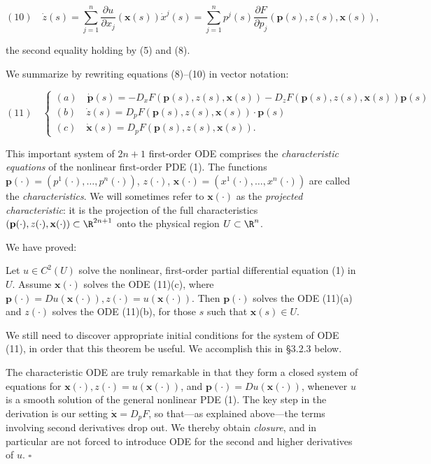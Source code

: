 $$(10) \quad \dot{z}(s) = \sum_{j=1}^{n} \frac{\partial u}{\partial x_j}(\mathbf{x}(s))\dot{x}^j(s) = \sum_{j=1}^{n} p^j(s) \frac{\partial F}{\partial p_j}(\mathbf{p}(s), z(s), \mathbf{x}(s)),$$

the second equality holding by (5) and (8).

We summarize by rewriting equations (8)--(10) in vector notation:

$$(11) \quad \begin{cases} (a) \quad \dot{\mathbf{p}}(s) = -D_x F(\mathbf{p}(s), z(s), \mathbf{x}(s)) - D_z F(\mathbf{p}(s), z(s), \mathbf{x}(s))\mathbf{p}(s) \\ (b) \quad \dot{z}(s) = D_p F(\mathbf{p}(s), z(s), \mathbf{x}(s)) \cdot \mathbf{p}(s) \\ (c) \quad \dot{\mathbf{x}}(s) = D_p F(\mathbf{p}(s), z(s), \mathbf{x}(s)). \end{cases}$$

This important system of $2n + 1$ first-order ODE comprises the \textit{characteristic equations} of the nonlinear first-order PDE (1). The functions $\mathbf{p}(\cdot) = (p^1(\cdot), \ldots, p^n(\cdot))$, $z(\cdot)$, $\mathbf{x}(\cdot) = (x^1(\cdot), \ldots, x^n(\cdot))$ are called the \textit{characteristics}. We will sometimes refer to $\mathbf{x}(\cdot)$ as the \textit{projected characteristic}: it is the projection of the full characteristics $(\mathbf{p}(\cdot), z(\cdot), \mathbf{x}(\cdot)) \subset \R^{2n+1}$ onto the physical region $U \subset \R^n$.

We have proved:

\begin{theorem}
\label{thm:characteristic-ode-structure}
Let $u \in C^2(U)$ solve the nonlinear, first-order partial differential equation (1) in $U$. Assume $\mathbf{x}(\cdot)$ solves the ODE (11)(c), where $\mathbf{p}(\cdot) = Du(\mathbf{x}(\cdot)), z(\cdot) = u(\mathbf{x}(\cdot))$. Then $\mathbf{p}(\cdot)$ solves the ODE (11)(a) and $z(\cdot)$ solves the ODE (11)(b), for those $s$ such that $\mathbf{x}(s) \in U$.
\end{theorem}

We still need to discover appropriate initial conditions for the system of ODE (11), in order that this theorem be useful. We accomplish this in \S3.2.3 below.

\begin{remark}
\label{rem:characteristic-ode-closure}
The characteristic ODE are truly remarkable in that they form a closed system of equations for $\mathbf{x}(\cdot), z(\cdot) = u(\mathbf{x}(\cdot))$, and $\mathbf{p}(\cdot) = Du(\mathbf{x}(\cdot))$, whenever $u$ is a smooth solution of the general nonlinear PDE (1). The key step in the derivation is our setting $\dot{\mathbf{x}} = D_p F$, so that---as explained above---the terms involving second derivatives drop out. We thereby obtain \textit{closure}, and in particular are not forced to introduce ODE for the second and higher derivatives of $u$. $\square$
\end{remark}

